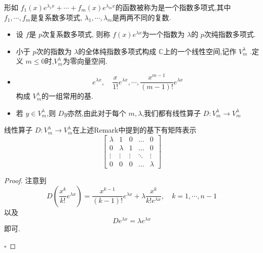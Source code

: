 \documentclass[lang=cn,12pt,color=green,fontset=none]{elegantbook}
\begin{document}
\begin{definition}
    形如 \(  f_1\left( x \right)e^{\lambda_1x}+ \cdots + f_{m}\left( x \right)e^{\lambda_{m}x}    \)的函数被称为是一个指数多项式,其中 \(  f_1,\cdots,f_m   \)是复系数多项式, \(   \lambda_1,\cdots,\lambda_m   \)是两两不同的复数.   
\end{definition}
\begin{remark}
    \begin{itemize}
        \item 设 \(  f  \)是 \(  p  \)次复系数多项式, 则称 \(  f\left( x \right)e^{\lambda x}   \)为一个指数为 \(  \lambda  \)的 \(  p  \)次纯指数多项式.
        \item   小于 \(  p  \)次的指数为 \(  \lambda  \)的全体纯指数多项式构成 \(  \mathbb{C}   \)上的一个线性空间,记作 \(  V_{m}^{\lambda}  \)    .定义 \(  m\le 0  \)时,\(  V_{m}^{\lambda}  \)为零向量空间.
        \item  \[
        e^{\lambda x},\quad  \frac{x }{1! }e^{\lambda x},\cdots ,  \frac{x^{m-1} }{\left( m-1 \right)!  }e^{ \lambda x}  
        \]构成 \(  V_{m}^{\lambda}  \)的一组常用的基.
        \item 若 \(  y \in V_{m}^{\lambda}  \),则 \(  Dy  \)亦然,由此对于每个 \(  m,\lambda  \),我们都有线性算子 \(  D:V_{m}^{\lambda}\to  V_{m}^{\lambda}  \)       
    \end{itemize}
    
\end{remark}

\begin{proposition}
    线性算子 \(  D:V_{m}^{\lambda}\to V_{m}^{\lambda}  \)在上述Remark中提到的基下有矩阵表示 \[
        \begin{bmatrix}\lambda&1&0&\ldots&0\\0&\lambda&1&\ldots&0\\\vdots&\vdots&\vdots&\ddots&\vdots\\0&0&0&\ldots&\lambda\end{bmatrix}
    \] 
\end{proposition}

\begin{proof}
    注意到 \[
    D\left( \frac{x^{k} }{ k!  }e^{\lambda x}  \right) = \frac{x^{k-1} }{\left( k-1 \right)!  }e^{\lambda x}+  \lambda \frac{x^{k} }{k! e^{\lambda x}}   ,\quad  k=1,\cdots ,n-1
    \]以及 \[
    D e^{\lambda x} = \lambda e^{ \lambda x}
    \]即可.

    \hfill $\square$
\end{proof}
\end{document}
